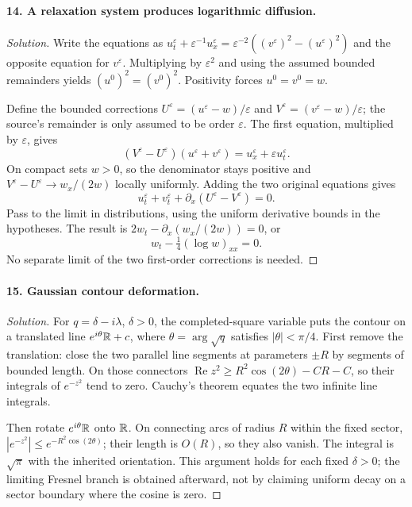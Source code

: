 \paragraph{14. A relaxation system produces logarithmic diffusion.}
\begin{proof}[Solution]
Write the equations as
$u_t^\varepsilon+\varepsilon^{-1}u_x^\varepsilon
=\varepsilon^{-2}((v^\varepsilon)^2-(u^\varepsilon)^2)$
and the opposite equation for $v^\varepsilon$.
Multiplying by $\varepsilon^2$ and using the assumed bounded
remainders yields $(u^0)^2=(v^0)^2$.
Positivity forces $u^0=v^0=w$.

Define the bounded corrections
$U^\varepsilon=(u^\varepsilon-w)/\varepsilon$ and
$V^\varepsilon=(v^\varepsilon-w)/\varepsilon$;
the source's remainder is only assumed to be order $\varepsilon$.
The first equation, multiplied by $\varepsilon$, gives
\[
 (V^\varepsilon-U^\varepsilon)(u^\varepsilon+v^\varepsilon)
       =u_x^\varepsilon+\varepsilon u_t^\varepsilon.
\]
On compact sets $w>0$, so the denominator stays positive and
$V^\varepsilon-U^\varepsilon\to w_x/(2w)$ locally uniformly.
Adding the two original equations gives
\[
 u_t^\varepsilon+v_t^\varepsilon
                 +\partial_x(U^\varepsilon-V^\varepsilon)=0 .
\]
Pass to the limit in distributions, using the uniform derivative
bounds in the hypotheses. The result is
$2w_t-\partial_x(w_x/(2w))=0$, or
\[
 w_t-\tfrac14(\log w)_{xx}=0 .
\]
No separate limit of the two first-order corrections is needed.
\end{proof}
\Needspace{45mm}

\Needspace{30mm}
\paragraph{15. Gaussian contour deformation.}
\begin{proof}[Solution]
For $q=\delta-i\lambda$, $\delta>0$, the completed-square variable
puts the contour on a translated line $e^{i\theta}\mathbb{R}+c$,
where $\theta=\arg\sqrt q$ satisfies $|\theta|<\pi/4$.
First remove the translation: close the two parallel line segments
at parameters $\pm R$ by segments of bounded length.
On those connectors
$\operatorname{Re}z^2\geq R^2\cos(2\theta)-C R-C$,
so their integrals of $e^{-z^2}$ tend to zero.
Cauchy's theorem equates the two infinite line integrals.

Then rotate $e^{i\theta}\mathbb{R}$ onto $\mathbb{R}$.
On connecting arcs of radius $R$ within the fixed sector,
$|e^{-z^2}|\leq e^{-R^2\cos(2\theta)}$; their length is $O(R)$,
so they also vanish. The integral is $\sqrt\pi$ with the inherited
orientation.
This argument holds for each fixed $\delta>0$;
the limiting Fresnel branch is obtained afterward, not by claiming
uniform decay on a sector boundary where the cosine is zero.
\end{proof}

